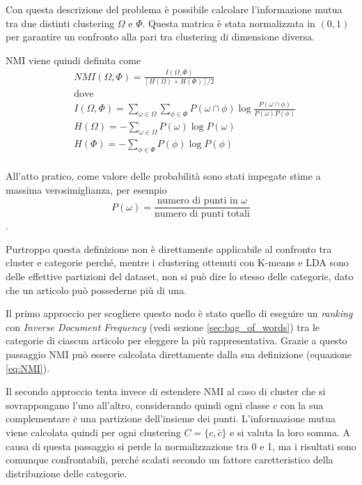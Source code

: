 \documentclass[
	12pt, %
	a4paper, %
	oneside, %
	headinclude,footinclude, %
	BCOR5mm, %
]{scrartcl}
\begin{document}
			Con questa descrizione del problema è possibile calcolare l'informazione mutua tra due distinti clustering $\Omega$ e $\Phi$.
			Questa matrica è stata normalizzata in $(0, 1)$ per garantire un confronto alla pari tra clustering di dimensione diversa.

			NMI viene quindi definita come
			\begin{equation} \begin{aligned} \label{eq:NMI}
				& NMI(\Omega, \Phi) = \frac
					{I(\Omega, \Phi)}
					{\left[ H(\Omega) + H(\Phi)\right] / 2} \\
				& \text{dove} \\
				& I(\Omega, \Phi) =
					\sum_{\omega \in \Omega} \sum_{\phi \in \Phi}
						P(\omega \cap \phi) \log \frac {P(\omega \cap \phi)} {P(\omega) P(\phi)} \\
				& H(\Omega) = - \sum_{\omega \in \Omega} P(\omega) \log P(\omega) \\
				& H(\Phi) = - \sum_{\phi \in \Phi} P(\phi) \log P(\phi) \\
			\end{aligned} \end{equation}

			All'atto pratico, come valore delle probabilità sono stati impegate stime a massima verosimiglianza, per esempio
			\begin{equation*}
				P(\omega) = \frac
					{ \text{numero di punti in }\omega }
					{ \text{numero di punti totali} }
			\end{equation*}.

			\bigbreak

			Purtroppo questa definizione non è direttamente applicabile al confronto tra cluster e categorie perché, mentre i clustering ottenuti con K-means e LDA sono delle effettive partizioni del dataset, non si può dire lo stesso delle categorie, dato che un articolo può possederne più di una.

			Il primo approccio per scogliere questo nodo è stato quello di eseguire un \emph{ranking} con \emph{Inverse Document Frequency} (vedi sezione \ref{sec:bag_of_words}) tra le categorie di ciascun articolo per eleggere la più rappresentativa.
			Grazie a questo passaggio NMI può essere calcolata direttamente dalla sua definizione (equazione \ref{eq:NMI}).

			Il secondo approccio tenta invece di estendere NMI al caso di cluster che si sovrappongano l'uno all'altro, considerando quindi ogni classe $c$ con la sua complementare $\bar{c}$ una partizione dell'insieme dei punti.
			L'informazione mutua viene calcolata quindi per ogni clustering $C = \{c, \bar{c}\}$ e si valuta la loro somma. A causa di questa passaggio si perde la normalizzazione tra 0 e 1, ma i risultati sono comunque confrontabili, perché scalati secondo un fattore caretteristico della distribuzione delle categorie.
\end{document}

